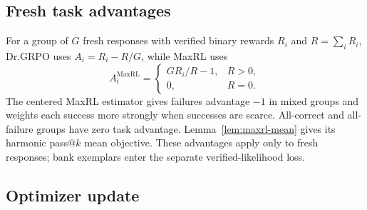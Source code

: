 \documentclass{article}
\newcommand{\1}{\mathbf 1}
\theoremstyle{remark}
\theoremstyle{definition}
\theoremstyle{plain}
\begin{document}
\subsection{Fresh task advantages}
\label{app:binary-maxrl}

For a group of $G$ fresh responses with verified binary rewards $R_i$ and
$R=\sum_i R_i$, Dr.GRPO uses $A_i=R_i-R/G$, while MaxRL uses
\[
 A_i^{\mathrm{MaxRL}}=
 \begin{cases}
 G R_i/R-1, & R>0,\\
 0, & R=0.
 \end{cases}
\]
The centered MaxRL estimator \citep{tajwar2026maxrl} gives failures advantage
$-1$ in mixed groups and weights each success more strongly when successes
are scarce. All-correct and all-failure groups have zero task advantage.
Lemma~\ref{lem:maxrl-mean} gives its harmonic pass@\(k\) mean objective.
These advantages apply only to fresh responses; bank exemplars enter the
separate verified-likelihood loss.

\subsection{Optimizer update}
\label{app:algorithm-update}
\end{document}
